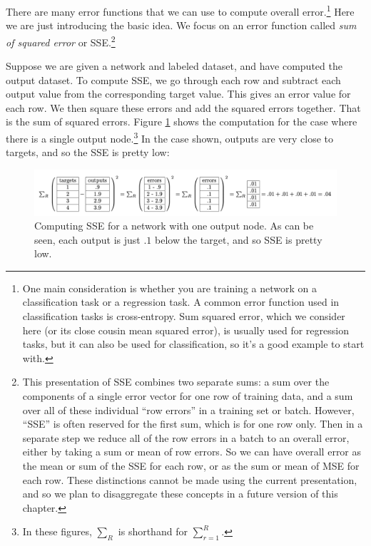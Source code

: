 There are many error functions that we can use to compute overall error.\footnote{One main consideration is whether you are training a network on a classification task or a regression task.  A common error function used in classification tasks is cross-entropy.  Sum squared error, which we consider here (or its close cousin mean squared error), is usually used for regression tasks, but it can also be used for classification, so it's a good example to start with.} Here we are just introducing the basic idea. We focus on an error function called \emph{sum of squared error} or SSE.\footnote{This presentation of SSE combines two separate sums: a sum over the components of a single error vector for one row of training data, and a sum over all of these individual ``row errors'' in a training set or batch. However, ``SSE'' is often reserved for the first sum, which is for one row only.  Then in a separate step we reduce all of the row errors in a batch to an overall error, either by taking a sum or mean of row errors. So we can have overall error as the mean or sum of the SSE for each row, or as the sum or mean of MSE for each row. These distinctions cannot be made using the current presentation, and so we plan to disaggregate these concepts in a future version of this chapter.}  

Suppose we are given a network and labeled dataset, and have computed the output dataset. To compute SSE, we go through each row and subtract each output value from the corresponding target value. This gives an error value for each row. We then square these errors and add the squared errors together. That is the sum of squared errors. Figure \ref{error_computation1} shows the computation for the case where there is a single output node.\footnote{In these figures, $\sum_R$ is shorthand for $\sum_{r=1}^{R}$.}  In the case shown, outputs are very close to targets, and so the SSE is pretty low:

\begin{figure}[h]
\centering
\includegraphics[scale=.5]{./images/ErrorComputation_1.png}
\caption[Jeff Yoshimi.]{Computing SSE for a network with one output node. As can be seen, each output is just $.1$ below the target, and so SSE is pretty low. }
\label{error_computation1}
\end{figure}

